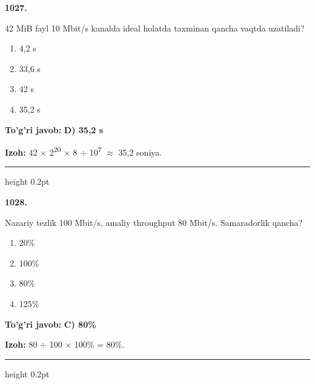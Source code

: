 \documentclass[10pt,a4paper,oneside]{article}
\begin{document}
\noindent\textbf{\color{ink}1027.}
\par
42 MiB fayl 10 Mbit/s kanalda ideal holatda taxminan qancha vaqtda uzatiladi?
\begin{enumerate}[label=\Alph*),leftmargin=9mm]
\item 4,2 s
\item 33,6 s
\item 42 s
\item 35,2 s
\end{enumerate}
\begin{tcolorbox}[enhanced,breakable,colback=teal!4,colframe=teal!50!black,boxrule=0.5pt,arc=1.1mm,left=3mm,right=3mm,top=1.7mm,bottom=1.7mm,before skip=2mm,after skip=2mm]
\textbf{\color{teal}To'g'ri javob:} \textbf{D) 35,2 s}
\par\smallskip
\textbf{Izoh:} 42 \ensuremath{\times} 2\textsuperscript{2}\textsuperscript{0} \ensuremath{\times} 8 \ensuremath{\div} 10\textsuperscript{7} \ensuremath{\approx} 35,2 soniya.
\end{tcolorbox}
\vspace{2mm}\hrule height 0.2pt \vspace{3mm}

\noindent\textbf{\color{ink}1028.}
\par
Nazariy tezlik 100 Mbit/s, amaliy throughput 80 Mbit/s. Samaradorlik qancha?
\begin{enumerate}[label=\Alph*),leftmargin=9mm]
\item 20\%
\item 100\%
\item 80\%
\item 125\%
\end{enumerate}
\begin{tcolorbox}[enhanced,breakable,colback=teal!4,colframe=teal!50!black,boxrule=0.5pt,arc=1.1mm,left=3mm,right=3mm,top=1.7mm,bottom=1.7mm,before skip=2mm,after skip=2mm]
\textbf{\color{teal}To'g'ri javob:} \textbf{C) 80\%}
\par\smallskip
\textbf{Izoh:} 80 \ensuremath{\div} 100 \ensuremath{\times} 100\% = 80\%.
\end{tcolorbox}
\vspace{2mm}\hrule height 0.2pt \vspace{3mm}
\end{document}
